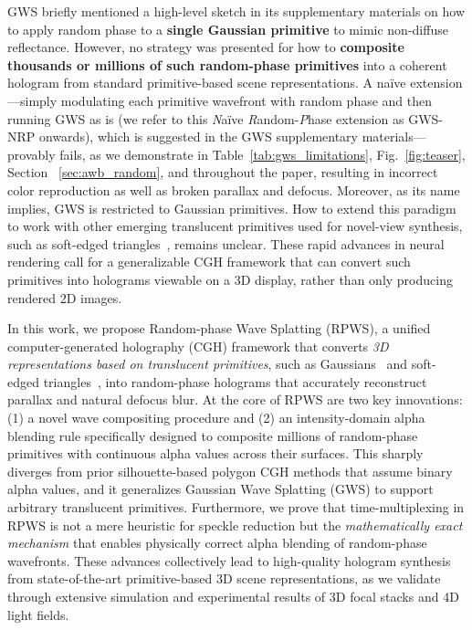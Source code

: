 GWS briefly mentioned a high-level sketch in its supplementary materials on how to apply random phase to a \textbf{single Gaussian primitive} to mimic non-diffuse reflectance. However, no strategy was presented for how to \textbf{composite thousands or millions of such random-phase primitives} into a coherent hologram from standard primitive-based scene representations. A na\"ive extension---simply modulating each primitive wavefront with random phase and then running GWS as is (we refer to this \textit{N}a\"ive \textit{R}andom-\textit{P}hase extension as GWS-NRP onwards), which is suggested in the GWS supplementary materials---provably fails, as we demonstrate in Table~\ref{tab:gws_limitations}, Fig.~\ref{fig:teaser}, Section ~\ref{sec:awb_random}, and throughout the paper, resulting in incorrect color reproduction as well as broken parallax and defocus. Moreover, as its name implies, GWS is restricted to Gaussian primitives. How to extend this paradigm to work with other emerging translucent primitives used for novel-view synthesis, such as soft-edged triangles~\cite{sheng20252dtrianglesplattingdirect,burgdorfer2025radianttrianglesoupsoft,Held2025Triangle}, remains unclear. These rapid advances in neural rendering call for a generalizable CGH framework that can convert such primitives into holograms viewable on a 3D display, rather than only producing rendered 2D images.



In this work, we propose Random-phase Wave Splatting (RPWS), a unified computer-generated holography (CGH) framework that converts \textit{3D representations based on translucent primitives}, such as Gaussians~\cite{kerbl3Dgaussians,huang20242d} and soft-edged triangles~\cite{Held2025Triangle,sheng20252dtrianglesplattingdirect,burgdorfer2025radianttrianglesoupsoft}, into random-phase holograms that accurately reconstruct parallax and natural defocus blur.  At the core of RPWS are two key innovations: (1) a novel wave compositing procedure and (2) an intensity-domain alpha blending rule specifically designed to composite millions of random-phase primitives with continuous alpha values across their surfaces. This sharply diverges from prior silhouette-based polygon CGH methods that assume binary alpha values, and it generalizes Gaussian Wave Splatting (GWS) to support arbitrary translucent primitives. Furthermore, we prove that time-multiplexing in RPWS is not a mere heuristic for speckle reduction but the \emph{mathematically exact mechanism} that enables physically correct alpha blending of random-phase wavefronts. These advances collectively lead to high-quality hologram synthesis from state-of-the-art primitive-based 3D scene representations, as we validate through extensive simulation and experimental results of 3D focal stacks and 4D light fields.

